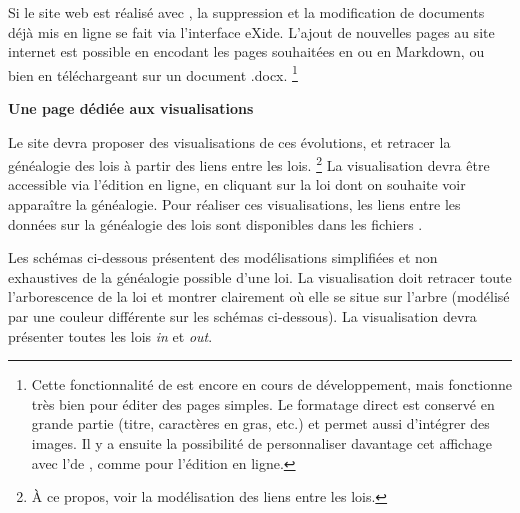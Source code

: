 Si le site web est réalisé avec \tp, la suppression et la modification de documents déjà mis en ligne se fait via l’interface eXide. L’ajout de nouvelles pages au site internet est possible en encodant les pages souhaitées en \TEI ou en Markdown, ou bien en téléchargeant sur \tp un document .docx. \footnote{Cette fonctionnalité de \tp est encore en cours de développement, mais fonctionne très bien pour éditer des pages simples. Le formatage direct est conservé en grande partie (titre, caractères en gras, etc.) et permet aussi d’intégrer des images. Il y a ensuite la possibilité de personnaliser davantage cet affichage avec l’\ODD de \tp, comme pour l’édition en ligne.}

\bigskip
\textbf{Une page dédiée aux visualisations}

Le site devra proposer des visualisations de ces évolutions, et retracer la généalogie des lois à partir des liens entre les lois. \footnote{À ce propos, voir la modélisation des liens entre les lois.}  La visualisation devra être accessible via l’édition en ligne, en cliquant sur la loi dont on souhaite voir apparaître la généalogie. Pour réaliser ces visualisations, les liens entre les données sur la généalogie des lois sont disponibles dans les fichiers \JSON. 

Les schémas ci-dessous présentent des modélisations simplifiées et non exhaustives de la généalogie possible d’une loi. La visualisation doit retracer toute l’arborescence de la loi et montrer clairement où elle se situe sur l’arbre (modélisé par une couleur différente sur les schémas ci-dessous). La visualisation devra présenter toutes les lois \textit{in} et \textit{out}. 

